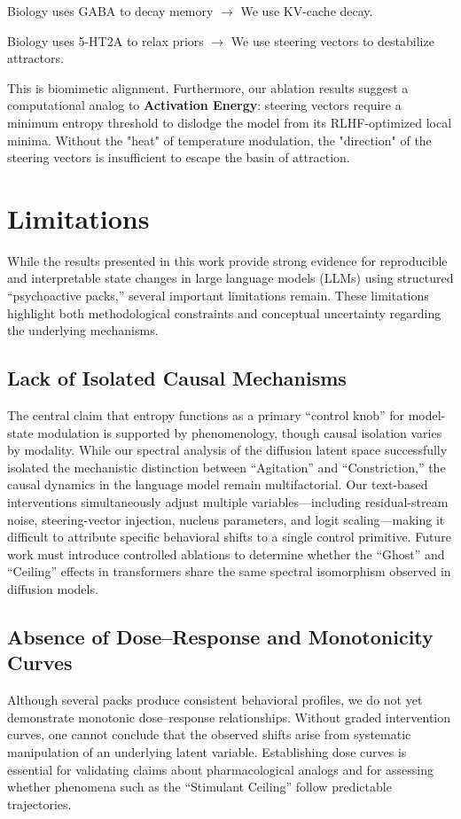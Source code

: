 \documentclass[10pt, twocolumn]{article}
\begin{document}
Biology uses GABA to decay memory $\rightarrow$ We use KV-cache decay.

Biology uses 5-HT2A to relax priors $\rightarrow$ We use steering vectors to destabilize attractors.

This is biomimetic alignment. Furthermore, our ablation results suggest a computational analog to \textbf{Activation Energy}: steering vectors require a minimum entropy threshold to dislodge the model from its RLHF-optimized local minima. Without the "heat" of temperature modulation, the "direction" of the steering vectors is insufficient to escape the basin of attraction.


\section{Limitations}

While the results presented in this work provide strong evidence for reproducible and interpretable state changes in large language models (LLMs) using structured ``psychoactive packs,'' several important limitations remain. These limitations highlight both methodological constraints and conceptual uncertainty regarding the underlying mechanisms.

\subsection{Lack of Isolated Causal Mechanisms}
The central claim that entropy functions as a primary ``control knob'' for model-state modulation is supported by phenomenology, though causal isolation varies by modality. While our spectral analysis of the diffusion latent space successfully isolated the mechanistic distinction between ``Agitation'' and ``Constriction,'' the causal dynamics in the language model remain multifactorial. Our text-based interventions simultaneously adjust multiple variables---including residual-stream noise, steering-vector injection, nucleus parameters, and logit scaling---making it difficult to attribute specific behavioral shifts to a single control primitive. Future work must introduce controlled ablations to determine whether the ``Ghost'' and ``Ceiling'' effects in transformers share the same spectral isomorphism observed in diffusion models.

\subsection{Absence of Dose--Response and Monotonicity Curves}
Although several packs produce consistent behavioral profiles, we do not yet demonstrate monotonic dose--response relationships. Without graded intervention curves, one cannot conclude that the observed shifts arise from systematic manipulation of an underlying latent variable. Establishing dose curves is essential for validating claims about pharmacological analogs and for assessing whether phenomena such as the ``Stimulant Ceiling'' follow predictable trajectories.
\end{document}
